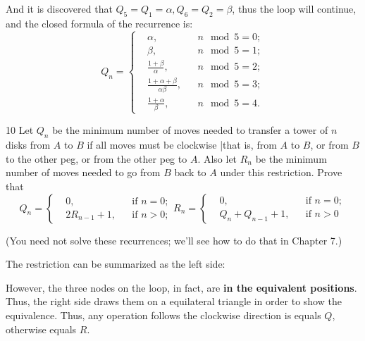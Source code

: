 \documentclass[a4paper,12pt]{article}
\makeatletter
\newtheorem*{solution}{Solution}
\theoremstyle{definition}
\renewenvironment{solution}[1][Solution] {\par\pushQED{\qed}\normalfont\topsep6\p@\@plus6\p@\relax\trivlist\item[\hskip\labelsep\bfseries#1\@addpunct{.}]\ignorespaces}{\popQED\endtrivlist\@endpefalse} \makeatother
\newenvironment{problems}{\begin{list}{}{\renewcommand{\makelabel}[1]{\textbf{##1}\hfil}}}{\end{list}}
\makeatother
\begin{document}
\begin{problems}
\begin{solution}
        And it is discovered that $Q_5=Q_1=\alpha, Q_6=Q_2=\beta$, thus the loop will continue, and the closed formula of the recurrence is:
        \begin{equation*}
            Q_n=\left\{\begin{aligned}
                &\alpha,    &&n \mod 5=0;\\
                &\beta,     &&n \mod 5=1;\\
                &\frac{1+\beta}{\alpha}, && n \mod 5=2;\\
                &\frac{1+\alpha+\beta}{\alpha\beta}, && n \mod 5=3;\\
                &\frac{1+\alpha}{\beta}, &&  n \mod 5=4.
            \end{aligned}\right.
        \end{equation*}
    \end{solution}
    \item[10] Let $Q_n$ be the minimum number of moves needed to transfer a tower of
    $n$ disks from $A$ to $B$ if all moves must be clockwise |that is, from $A$
    to $B$, or from $B$ to the other peg, or from the other peg to $A$. Also let $R_n$
    be the minimum number of moves needed to go from $B$ back to $A$ under
    this restriction. Prove that
    \begin{equation*}
            Q_n=\left\{
                \begin{aligned}
                    &0,&& \text{if } n=0;\\
                    &2R_{n-1}+1,&&\text{if } n>0; 
                \end{aligned}
            \right.
            R_n=\left\{
                \begin{aligned}
                &0,&&\text{if } n=0;\\
                &Q_n+Q_{n-1}+1,&&\text{if } n>0 
            \end{aligned}
                \right.
    \end{equation*}

    (You need not solve these recurrences; we'll see how to do that in Chapter 7.)
    \begin{solution}
        The restriction can be summarized as the left side:

        \begin{center}
            
        \end{center}
        
        However, the three nodes on the loop, in fact, are \textbf{in the equivalent positions}. Thus, the right side draws them on a equilateral triangle in order to show the equivalence. Thus, any operation follows the clockwise direction is equals $Q$, otherwise equals $R$.


\end{solution}
\end{problems}
\end{document}
